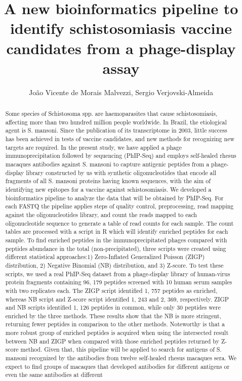 \documentclass[twoside]{article}
\title{\vspace{-15mm}\fontsize{24pt}{10pt}\selectfont\textbf{ A new bioinformatics pipeline to identify schistosomiasis vaccine candidates from a phage-display assay }} %
\author{ Jo\~ao Vicente de Morais Malvezzi, Sergio Verjovski-Almeida }
\affil{ Instituto Butantan }
\date{}
\begin{document}
  
  
  \maketitle %
  
  
  \thispagestyle{fancy} %
  
  
  \begin{abstract}
  Some species of  Schistosoma spp. are haemoparasites that cause schistosomiasis,  affecting more than two hundred million people worldwide. In Brazil,  the etiological agent is S. mansoni. Since the publication of its transcriptome in 2003,  little success has been achieved in tests of vaccine candidates,  and new methods for recognizing new targets are required. In the present study,  we have applied a phage immunoprecipitation followed by sequencing (PhIP-Seq) and employs self-healed rhesus macaques antibodies against S. mansoni to capture antigenic peptides from a phage-display library constructed by us with synthetic oligonucleotides that encode all fragments of all S. mansoni proteins having known sequences,  with the aim of identifying new epitopes for a vaccine against schistosomiasis. We developed a bioinformatics pipeline to analyze the data that will be obtained by PhIP-Seq. For each FASTQ the pipeline applies steps of quality control,  preprocessing,  read mapping against the oligonucleotides library,  and count the reads mapped to each oligonucleotide sequence to generate a table of read counts for each sample. The count tables are processed with a script in R which will identify enriched peptides for each sample. To find enriched peptides in the immunoprecipitated phages compared with peptides abundance in the total (non-precipitated),  three scripts were created using different statistical approaches:1) Zero-Inflated Generalized Poisson (ZIGP) distribution,   2) Negative Binomial (NB) distribution,  and 3) Z-score. To test these scripts,  we used a real PhIP-Seq dataset from a phage-display library of human-virus protein fragments containing 96, 179 peptides screened with 10 human serum samples with two replicates each. The ZIGP script identified 1, 757 peptides as enriched,  whereas NB script and Z-score script identified 1, 243 and  2, 369,  respectively. ZIGP and NB scripts identified 1, 126 peptides in common,  while only 30 peptides were enriched by the three methods. These results show that the NB is more stringent,  returning fewer peptides in comparison to the other methods. Noteworthy is that a more robust group of enriched peptides is acquired when using the intersected result between NB and ZIGP when compared with those enriched peptides returned by Z-score method. Given that,  this pipeline will be applied to search for antigens of S. mansoni recognized by the antibodies from twelve self-healed rhesus macaques sera. We expect to find groups of macaques that developed antibodies for different antigens or even the same antibodies at different 
\end{abstract}
\end{document}
